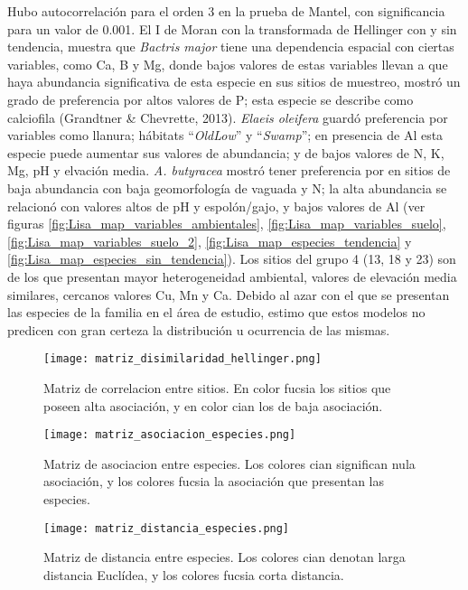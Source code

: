 \documentclass[11pt,]{article}
\begin{document}
Hubo autocorrelación para el orden 3 en la prueba de Mantel, con
significancia para un valor de 0.001. El I de Moran con la transformada
de Hellinger con y sin tendencia, muestra que \emph{Bactris major} tiene
una dependencia espacial con ciertas variables, como Ca, B y Mg, donde
bajos valores de estas variables llevan a que haya abundancia
significativa de esta especie en sus sitios de muestreo, mostró un grado
de preferencia por altos valores de P; esta especie se describe como
calciofila (Grandtner \& Chevrette, 2013). \emph{Elaeis oleifera} guardó
preferencia por variables como llanura; hábitats ``\emph{OldLow}'' y
``\emph{Swamp}''; en presencia de Al esta especie puede aumentar sus
valores de abundancia; y de bajos valores de N, K, Mg, pH y elvación
media. \emph{A. butyracea} mostró tener preferencia por en sitios de
baja abundancia con baja geomorfología de vaguada y N; la alta
abundancia se relacionó con valores altos de pH y espolón/gajo, y bajos
valores de Al (ver figuras \ref{fig:Lisa_map_variables_ambientales},
\ref{fig:Lisa_map_variables_suelo},
\ref{fig:Lisa_map_variables_suelo_2},
\ref{fig:Lisa_map_especies_tendencia} y
\ref{fig:Lisa_map_especies_sin_tendencia}). Los sitios del grupo 4 (13,
18 y 23) son de los que presentan mayor heterogeneidad ambiental,
valores de elevación media similares, cercanos valores Cu, Mn y Ca.
Debido al azar con el que se presentan las especies de la familia en el
área de estudio, estimo que estos modelos no predicen con gran certeza
la distribución u ocurrencia de las mismas.

\begin{figure}
\centering
\texttt{[image: matriz\_disimilaridad\_hellinger.png]}
\caption{Matriz de correlacion entre sitios. En color fucsia los sitios
que poseen alta asociación, y en color cian los de baja asociación.
\label{fig:matriz_disimilaridad_hellinger}}
\end{figure}

\begin{figure}
\centering
\texttt{[image: matriz\_asociacion\_especies.png]}
\caption{Matriz de asociacion entre especies. Los colores cian
significan nula asociación, y los colores fucsia la asociación que
presentan las especies. \label{fig:matriz_asociacion_especies}}
\end{figure}

\begin{figure}
\centering
\texttt{[image: matriz\_distancia\_especies.png]}
\caption{Matriz de distancia entre especies. Los colores cian denotan
larga distancia Euclídea, y los colores fucsia corta distancia.
\label{fig:matriz_distancia_especies}}
\end{figure}
\end{document}
